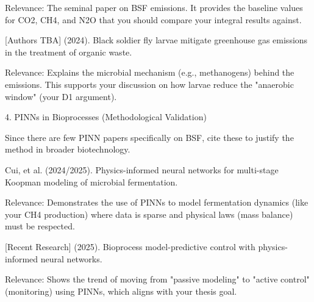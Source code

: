         Relevance: The seminal paper on BSF emissions. It provides the baseline values for CO2, CH4, and N2O that you should compare your integral results against.

    [Authors TBA] (2024). Black soldier fly larvae mitigate greenhouse gas emissions in the treatment of organic waste.

        Relevance: Explains the microbial mechanism (e.g., methanogens) behind the emissions. This supports your discussion on how larvae reduce the "anaerobic window" (your D1 argument).

4. PINNs in Bioprocesses (Methodological Validation)

Since there are few PINN papers specifically on BSF, cite these to justify the method in broader biotechnology.

    Cui, et al. (2024/2025). Physics-informed neural networks for multi-stage Koopman modeling of microbial fermentation.

        Relevance: Demonstrates the use of PINNs to model fermentation dynamics (like your CH4 production) where data is sparse and physical laws (mass balance) must be respected.

    [Recent Research] (2025). Bioprocess model-predictive control with physics-informed neural networks.

        Relevance: Shows the trend of moving from "passive modeling" to "active control" (monitoring) using PINNs, which aligns with your thesis goal.
